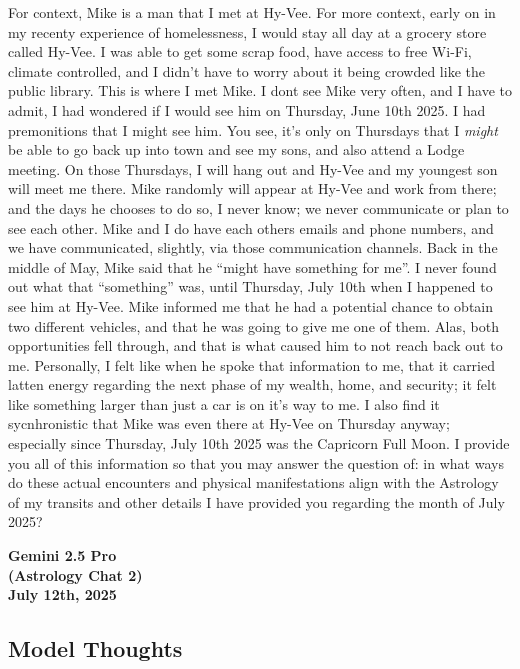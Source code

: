 \documentclass{article}
\begin{document}
For context, Mike is a man that I met at Hy-Vee. For more context, early
on in my recenty experience of homelessness, I would stay all day at a
grocery store called Hy-Vee. I was able to get some scrap food, have
access to free Wi-Fi, climate controlled, and I didn't have to worry
about it being crowded like the public library. This is where I met
Mike. I dont see Mike very often, and I have to admit, I had wondered if
I would see him on Thursday, June 10th 2025. I had premonitions that I
might see him. You see, it's only on Thursdays that I \emph{might} be
able to go back up into town and see my sons, and also attend a Lodge
meeting. On those Thursdays, I will hang out and Hy-Vee and my youngest
son will meet me there. Mike randomly will appear at Hy-Vee and work
from there; and the days he chooses to do so, I never know; we never
communicate or plan to see each other. Mike and I do have each others
emails and phone numbers, and we have communicated, slightly, via those
communication channels. Back in the middle of May, Mike said that he
``might have something for me''. I never found out what that
``something'' was, until Thursday, July 10th when I happened to see him
at Hy-Vee. Mike informed me that he had a potential chance to obtain two
different vehicles, and that he was going to give me one of them. Alas,
both opportunities fell through, and that is what caused him to not
reach back out to me. Personally, I felt like when he spoke that
information to me, that it carried latten energy regarding the next
phase of my wealth, home, and security; it felt like something larger
than just a car is on it's way to me. I also find it sycnhronistic that
Mike was even there at Hy-Vee on Thursday anyway; especially since
Thursday, July 10th 2025 was the Capricorn Full Moon. I provide you all
of this information so that you may answer the question of: in what ways
do these actual encounters and physical manifestations align with the
Astrology of my transits and other details I have provided you regarding
the month of July 2025?

\begin{center}
\textbf{Gemini 2.5 Pro} \\
\textbf{(Astrology Chat 2)} \\
\textbf{July 12th, 2025}
\end{center}



\subsection*{Model Thoughts}\label{model-thoughts}
\end{document}
